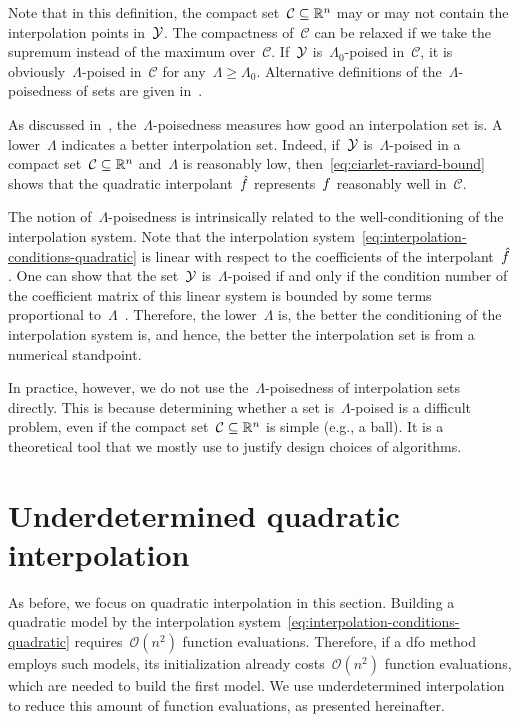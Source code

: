Note that in this definition, the compact set~$\mathcal{C} \subseteq \mathbb{R}^n$ may or may not contain the interpolation points in~$\xpt$.
The compactness of~$\mathcal{C}$ can be relaxed if we take the supremum instead of the maximum over~$\mathcal{C}$.
If~$\xpt$ is~$\Lambda_0$-poised in~$\mathcal{C}$, it is obviously~$\Lambda$-poised in~$\mathcal{C}$ for any~$\Lambda \ge \Lambda_0$.
Alternative definitions of the~$\Lambda$-poisedness of sets are given in~\cite[\S~3.3]{Conn_Scheinberg_Vicente_2009b}.

As discussed in~\cite[\S~3.3]{Conn_Scheinberg_Vicente_2009b}, the~$\Lambda$-poisedness measures how good an interpolation set is.
A lower~$\Lambda$ indicates a better interpolation set.
Indeed, if~$\xpt$ is~$\Lambda$-poised in a compact set~$\mathcal{C} \subseteq \mathbb{R}^n$ and~$\Lambda$ is reasonably low, then~\cref{eq:ciarlet-raviard-bound} shows that the quadratic interpolant~$\objm$ represents~$f$ reasonably well in~$\mathcal{C}$.

The notion of~$\Lambda$-poisedness is intrinsically related to the well-conditioning of the interpolation system.
Note that the interpolation system~\cref{eq:interpolation-conditions-quadratic} is linear with respect to the coefficients of the interpolant~$\objm$.
One can show that the set~$\xpt$ is~$\Lambda$-poised if and only if the condition number of the coefficient matrix of this linear system is bounded by some terms proportional to~$\Lambda$~\cite[Thm.~3.14]{Conn_Scheinberg_Vicente_2009b}.
Therefore, the lower~$\Lambda$ is, the better the conditioning of the interpolation system is, and hence, the better the interpolation set is from a numerical standpoint.

In practice, however, we do not use the~$\Lambda$-poisedness of interpolation sets directly.
This is because determining whether a set is~$\Lambda$-poised is a difficult problem, even if the compact set~$\mathcal{C} \subseteq \mathbb{R}^n$ is simple (e.g., a ball).
It is a theoretical tool that we mostly use to justify design choices of algorithms.

\section{Underdetermined quadratic interpolation}
\label{sec:underdetermined-interpolation}

As before, we focus on quadratic interpolation in this section.
Building a quadratic model by the interpolation system~\cref{eq:interpolation-conditions-quadratic} requires~$\mathcal{O}(n^2)$ function evaluations.
Therefore, if a \gls{dfo} method employs such models, its initialization already costs~$\mathcal{O}(n^2)$ function evaluations, which are needed to build the first model.
We use underdetermined interpolation to reduce this amount of function evaluations, as presented hereinafter.

